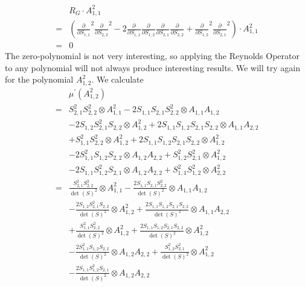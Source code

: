 \begin{example}
\begin{equation}
\begin{aligned}
      & R_G \cdot A_{1,1}^2 \\
      =& \left( \frac{\partial}{\partial S_{1,1}}^2 \frac{\partial}{\partial S_{2,2}}^2 - 2 \frac{\partial}{\partial S_{1,1}} \frac{\partial}{\partial S_{1,2}} \frac{\partial}{\partial S_{2,1}} \frac{\partial}{\partial S_{2,2}} + \frac{\partial}{\partial S_{1,2}}^2\frac{\partial}{\partial S_{2,1}}^2 \right) \cdot A_{1,1}^2 \\
      =& 0
    \end{aligned}
  \end{equation}
  The zero-polynomial is not very interesting, so applying the Reynolds Operator to any polynomial will not always produce interesting results.
  We will try again for the polynomial $A_{1,2}^2$.
  We calculate
  \begin{equation}
    \begin{aligned}
      &\mu^\prime ( A_{1,2}^2 ) \\
      =& S_{2,1}^2 S_{2,2}^2 \otimes A_{1,1}^2
      - 2S_{1,1}S_{2,1}S_{2,2}^2 \otimes A_{1,1}A_{1,2} \\
      &- 2S_{1,2}S_{2,1}^2S_{2,2} \otimes A_{1,2}^2 
      + 2S_{1,1}S_{1,2}S_{2,1}S_{2,2} \otimes A_{1,1}A_{2,2}\\
      &+ S_{1,1}^2S_{2,2}^2 \otimes A_{1,2}^2
      + 2S_{1,1}S_{1,2}S_{2,1}S_{2,2} \otimes A_{1,2}^2 \\
      &- 2S_{1,1}^2S_{1,2}S_{2,2} \otimes A_{1,2}A_{2,2}
      + S_{1,2}^2S_{2,1}^2 \otimes A_{1,2}^2 \\
      &- 2S_{1,1}S_{1,2}^2S_{2,1} \otimes A_{1,2}A_{2,2}
      + S_{1,1}^2S_{1,2}^2 \otimes A_{2,2}^2\\
      =& \frac{S_{2,1}^2 S_{2,2}^2}{\operatorname{det}(S)^2} \otimes A_{1,1}^2
      - \frac{2S_{1,1}S_{2,1}S_{2,2}^2}{\operatorname{det}(S)^2} \otimes A_{1,1}A_{1,2} \\
      &- \frac{2S_{1,2}S_{2,1}^2S_{2,2}}{\operatorname{det}(S)^2} \otimes A_{1,2}^2 
      + \frac{2S_{1,1}S_{1,2}S_{2,1}S_{2,2}}{\operatorname{det}(S)^2} \otimes A_{1,1}A_{2,2}\\
      &+ \frac{S_{1,1}^2S_{2,2}^2}{\operatorname{det}(S)^2} \otimes A_{1,2}^2
      + \frac{2S_{1,1}S_{1,2}S_{2,1}S_{2,2}}{\operatorname{det}(S)^2} \otimes A_{1,2}^2 \\
      &- \frac{2S_{1,1}^2S_{1,2}S_{2,2}}{\operatorname{det}(S)^2} \otimes A_{1,2}A_{2,2}
      + \frac{S_{1,2}^2S_{2,1}^2}{\operatorname{det}(S)^2} \otimes A_{1,2}^2 \\
      &- \frac{2S_{1,1}S_{1,2}^2S_{2,1}}{\operatorname{det}(S)^2} \otimes A_{1,2}A_{2,2}

\end{aligned}
\end{equation}
\end{example}
